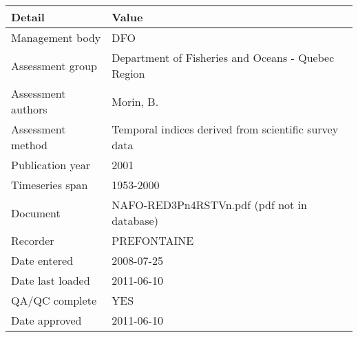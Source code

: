 \begin{table}[htb]
\centering
\begin{tabular}{lp{7cm}}
\toprule
Detail & Value \\
\midrule
Management body    & DFO                                                  \\
Assessment group   & Department of Fisheries and Oceans - Quebec Region   \\
Assessment authors & Morin, B.                                            \\
Assessment method  & Temporal indices derived from scientific survey data \\
Publication year   & 2001                                                 \\
Timeseries span    & 1953-2000                                            \\
Document           & NAFO-RED3Pn4RSTVn.pdf (pdf not in database)          \\
Recorder           & PREFONTAINE                                          \\
Date entered       & 2008-07-25                                           \\
Date last loaded   & 2011-06-10                                           \\
QA/QC complete     & YES                                                  \\
Date approved      & 2011-06-10                                           \\
\bottomrule
\end{tabular}
\label{tab:assessdet}
\end{table}
